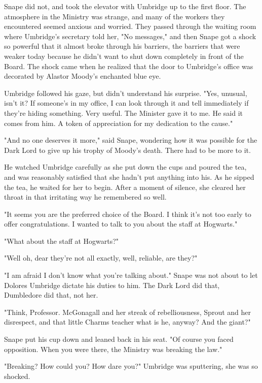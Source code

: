 Snape did not, and took the elevator with Umbridge up to the first floor. The atmosphere in the Ministry was strange, and many of the workers they encountered seemed anxious and worried. They passed through the waiting room where Umbridge's secretary told her, "No messages," and then Snape got a shock so powerful that it almost broke through his barriers, the barriers that were weaker today because he didn't want to shut down completely in front of the Board. The shock came when he realized that the door to Umbridge's office was decorated by Alastor Moody's enchanted blue eye.

Umbridge followed his gaze, but didn't understand his surprise. "Yes, unusual, isn't it? If someone's in my office, I can look through it and tell immediately if they're hiding something. Very useful. The Minister gave it to me. He said it comes from{\el} him. A token of appreciation for my dedication to the cause."

"And no one deserves it more," said Snape, wondering how it was possible for the Dark Lord to give up his trophy of Moody's death. There had to be more to it.

He watched Umbridge carefully as she put down the cups and poured the tea, and was reasonably satisfied that she hadn't put anything into his. As he sipped the tea, he waited for her to begin. After a moment of silence, she cleared her throat in that irritating way he remembered so well.

"It seems you are the preferred choice of the Board. I think it's not too early to offer congratulations. I wanted to talk to you about the staff at Hogwarts."

"What about the staff at Hogwarts?"

"Well{\el} oh, dear{\el} they're not all exactly, well, reliable, are they?"

"I am afraid I don't know what you're talking about." Snape was not about to let Dolores Umbridge dictate his duties to him. The Dark Lord did that, Dumbledore did that, not her.

"Think, Professor. McGonagall and her streak of rebelliousness, Sprout and her disrespect, and that little Charms teacher{\el} what is he, anyway? And the giant?"

Snape put his cup down and leaned back in his seat. "Of course you faced opposition. When you were there, the Ministry was breaking the law."

"Breaking{\el}? How could you? How dare you?" Umbridge was sputtering, she was so shocked.

